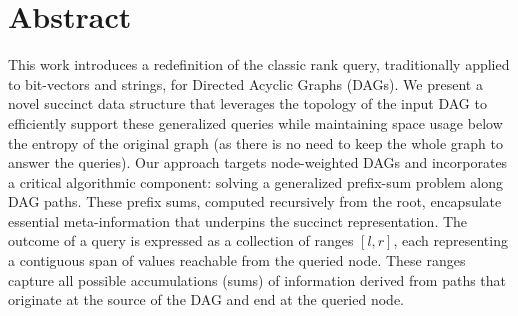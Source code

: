 


\begingroup
\let\clearpage\relax
\let\cleardoublepage\relax
\let\cleardoublepage\relax

\chapter*{Abstract}
This work introduces a redefinition of the classic rank query, traditionally applied to bit-vectors and strings, for Directed Acyclic Graphs (DAGs). We present a novel succinct data structure that leverages the topology of the input DAG to efficiently support these generalized queries while maintaining space usage below the entropy of the original graph (as there is no need to keep the whole graph to answer the queries). Our approach targets node-weighted DAGs and incorporates a critical algorithmic component: solving a generalized prefix-sum problem along DAG paths. These prefix sums, computed recursively from the root, encapsulate essential meta-information that underpins the succinct representation. The outcome of a query is expressed as a collection of ranges \([l, r]\), each representing a contiguous span of values reachable from the queried node. These ranges capture all possible accumulations (sums) of information derived from paths that originate at the source of the DAG and end at the queried node.
\endgroup

\vfill
